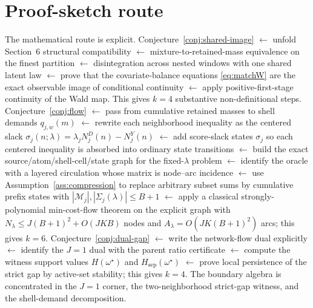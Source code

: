 \documentclass[11pt]{article}
\theoremstyle{definition}
\theoremstyle{plain}
\theoremstyle{remark}
\begin{document}
\section{Proof-sketch route}
The mathematical route is explicit. Conjecture~\ref{conj:shared-image}
\(\leftarrow\) unfold Section~6 structural compatibility
\(\leftarrow\) mixture-to-retained-mass equivalence on the finest partition
\(\leftarrow\) disintegration across nested windows with one shared latent law
\(\leftarrow\) prove that the covariate-balance equations \eqref{eq:matchW} are the exact
observable image of conditional continuity
\(\leftarrow\) apply positive-first-stage continuity of the Wald map. This gives \(k=4\)
substantive non-definitional steps. Conjecture~\ref{conj:flow}
\(\leftarrow\) pass from cumulative retained masses to shell demands \(q_{j,w}(m)\)
\(\leftarrow\) rewrite each neighborhood inequality as the centered slack
\(\sigma_j(n;\lambda)=\lambda_j N_j^D(n)-N_j^Y(n)\)
\(\leftarrow\) add score-slack states \(\sigma_j\) so each centered inequality is absorbed into
ordinary state transitions
\(\leftarrow\) build the exact source/atom/shell-cell/state graph for the fixed-\(\lambda\) problem
\(\leftarrow\) identify the oracle with a layered circulation whose matrix is node--arc incidence
\(\leftarrow\) use Assumption~\ref{ass:compression} to replace arbitrary subset sums by cumulative
prefix states with \(|\mathcal M_j|,|\Sigma_j(\lambda)|\le B+1\)
\(\leftarrow\) apply a classical strongly-polynomial min-cost-flow theorem on the explicit graph
with \(N_\lambda \le J(B+1)^2 + O(JKB)\) nodes and \(A_\lambda = O(JK(B+1)^2)\) arcs; this gives
\(k=6\). Conjecture~\ref{conj:dual-gap}
\(\leftarrow\) write the network-flow dual explicitly
\(\leftarrow\) identify the \(J=1\) dual with the parent ratio certificate
\(\leftarrow\) compute the witness support values \(H(\omega^\star)\) and
\(H_{\mathrm{sep}}(\omega^\star)\)
\(\leftarrow\) prove local persistence of the strict gap by active-set stability; this gives
\(k=4\). The boundary algebra is concentrated in the \(J=1\) corner, the two-neighborhood
strict-gap witness, and the shell-demand decomposition.
\end{document}
